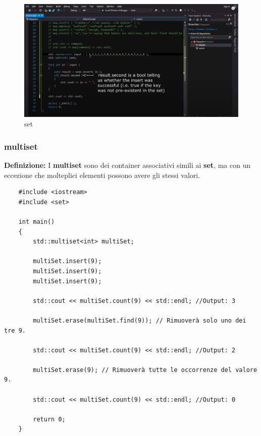 \newpage %

\begin{figure}[H]
	\centering
	\includegraphics[width=1\textwidth, height=1\textheight, keepaspectratio]{./imgs/set_insert_second_operations.png}
	\caption{set}
	\label{fig:set_insert_second_operations}
\end{figure}

\subsubsection{multiset}

\textsf{\small \textbf{Definizione: } I \textbf{multiset} sono dei container associativi simili ai \textbf{set}, ma con un eccezione che molteplici elementi possono avere gli stessi valori.} \\

\begin{lstlisting}
	#include <iostream>
	#include <set>
	
	int main()
	{
		std::multiset<int> multiSet;
		
		multiSet.insert(9);
		multiSet.insert(9);
		multiSet.insert(9);
		
		std::cout << multiSet.count(9) << std::endl; //Output: 3
		
		multiSet.erase(multiSet.find(9)); // Rimuoverà solo uno dei tre 9.
		
		std::cout << multiSet.count(9) << std::endl; //Output: 2
		
		multiSet.erase(9); // Rimuoverà tutte le occorrenze del valore 9.
		
		std::cout << multiSet.count(9) << std::endl; //Output: 0
		
		return 0;
	}
\end{lstlisting}

